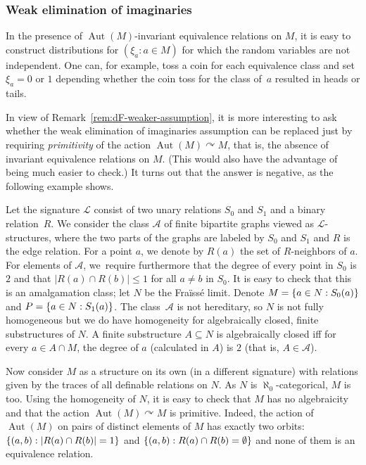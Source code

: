 \documentclass[11pt]{article}
\let\mathcal\mathscr
\let\actson\curvearrowright
\let\sub\subseteq
\theoremstyle{plain}
\theoremstyle{definition}
\newcommand{\cA}{\mathcal{A}}
\newcommand{\cL}{\mathcal{L}}
\DeclareMathOperator{\Aut}{Aut}
\DeclarePairedDelimiter\set{\{}{\}}
\begin{document}
\subsubsection{Weak elimination of imaginaries} In the presence of $\Aut(M)$-invariant equivalence relations on $M$, it is easy to construct distributions for $(\xi_a : a \in M)$ for which the random variables are not independent. One can, for example, toss a coin for each equivalence class and set $\xi_a = 0$ or $1$ depending whether the coin toss for the class of~$a$ resulted in heads or tails.

In view of Remark~\ref{rem:dF-weaker-assumption}, it is more interesting to ask whether the weak elimination of imaginaries assumption can be replaced just by requiring \emph{primitivity} of the action $\Aut(M) \actson M$, that is, the absence of invariant equivalence relations on $M$. (This would also have the advantage of being much easier to check.) It turns out that the answer is negative, as the following example shows.

Let the signature $\cL$ consist of two unary relations $S_0$ and $S_1$ and a binary relation~$R$. We consider the class $\cA$ of finite bipartite graphs viewed as $\cL$-structures, where the two parts of the graphs are labeled by $S_0$ and $S_1$ and $R$ is the edge relation. For a point $a$, we denote by $R(a)$ the set of $R$-neighbors of $a$. For elements of $\cA$, we~require furthermore that the degree of every point in $S_0$ is $2$ and that $|R(a) \cap R(b)| \leq 1$ for all $a \neq b$ in $S_0$. It is easy to check that this is an amalgamation class; let $N$ be the Fraïssé limit. Denote $M = \set{a \in N : S_0(a)}$ and $P = \set{a \in N : S_1(a)}$. The class~$\cA$ is not hereditary, so $N$ is not fully homogeneous but we do have homogeneity for algebraically closed, finite substructures of $N$. A finite substructure $A \sub N$ is algebraically closed iff for every $a \in A \cap M$, the degree of $a$ (calculated in $A$) is $2$ (that is, $A \in \cA$).

Now consider $M$ as a structure on its own (in a different signature) with relations given by the traces of all definable relations on $N$. As $N$ is $\aleph_0$-categorical, $M$ is too. Using the homogeneity of $N$, it is easy to check that $M$ has no algebraicity and that the action $\Aut(M) \actson M$ is primitive. Indeed, the action of $\Aut(M)$ on pairs of distinct elements of $M$ has exactly two orbits: $\set{(a, b) : |R(a) \cap R(b)| = 1}$ and $\set{(a, b) : R(a) \cap R(b) = \emptyset}$ and none of them is an equivalence relation.
\end{document}
